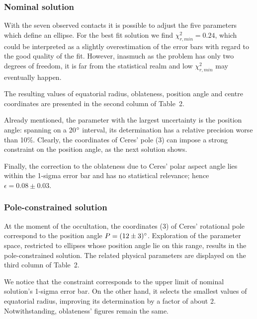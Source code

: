 \documentclass[useAMS,usenatbib]{mn2e}
\begin{document}
\subsubsection{Nominal solution}

With the seven observed contacts it is possible to adjust the five parameters which define an ellipse. For the best fit solution we find $\chi^2_{r,min} = 0.24$, which could be interpreted as a slightly overestimation of the error bars with regard to the good quality of the fit. However, inasmuch as the problem has only two degrees of freedom, it is far from the statistical realm and low $\chi^2_{r,min}$ may eventually happen.

The resulting values of equatorial radius, oblateness, position angle and centre coordinates are presented in the second column of Table~2.%

Already mentioned, the parameter with the largest uncertainty is the position angle: spanning on a 20$\hbox{$^\circ$}$ interval, its determination has a relative precision worse than 10$\%$. Clearly, the coordinates of Ceres' pole (3) can impose a strong constraint on the position angle, as the next solution shows.

Finally, the correction to the oblateness due to Ceres' polar aspect angle lies within the 1-sigma error bar and has no statistical relevance; hence $\epsilon = 0.08 \pm 0.03$.





\subsubsection{Pole-constrained solution}

At the moment of the occultation, the coordinates (3) of Ceres' rotational pole correspond to the position angle $P = (12 \pm 3)\hbox{$^\circ$}$. Exploration of the parameter space, restricted to ellipses whose position angle lie on this range, results in the pole-constrained solution. The related physical parameters are displayed on the third column of Table~2.

We notice that the constraint corresponds to the upper limit of nominal solution's 1-sigma error bar. On the other hand, it selects the smallest values of equatorial radius, improving its determination by a factor of about 2. Notwithstanding, oblateness' figures remain the same.
\end{document}
